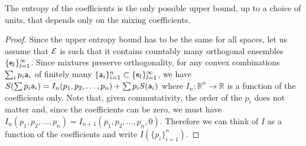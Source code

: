 \begin{prop}\label{pm_es_entropyUnique}
	The entropy of the coefficients is the only possible upper bound, up to a choice of units, that depends only on the mixing coefficients.
\end{prop}

\begin{proof}
	Since the upper entropy bound has to be the same for all spaces, let us assume that $\Ens$ is such that it contains countably many orthogonal ensembles $\{\ens_l\}_{l=1}^{\infty}$. Since mixtures preserve orthogonality, for any convex combinations $\sum_i p_i \ens[a]_i$ of finitely many $\{\ens[a]_i\}_{i=1}^{n} \subset \{\ens_l\}_{l=1}^{\infty}$,  we have $S(\sum p_i \ens[a]_i ) = I_n(p_1, p_2, \dots, p_n) + \sum p_i S(\ens[a]_i)$ where $I_n : \mathbb{R}^n \to \mathbb{R}$ is a function of the coefficients only. Note that, given commutativity, the order of the $p_i$ does not matter and, since the coefficients can be zero, we must have $I_n(p_1, p_2, \dots, p_n) = I_{n+1}(p_1, p_2, \dots, p_n, 0)$. Therefore we can think of $I$ as a function of the coefficients and write $I(\{p_i\}_{i=1}^{n})$.
	

\end{proof}
